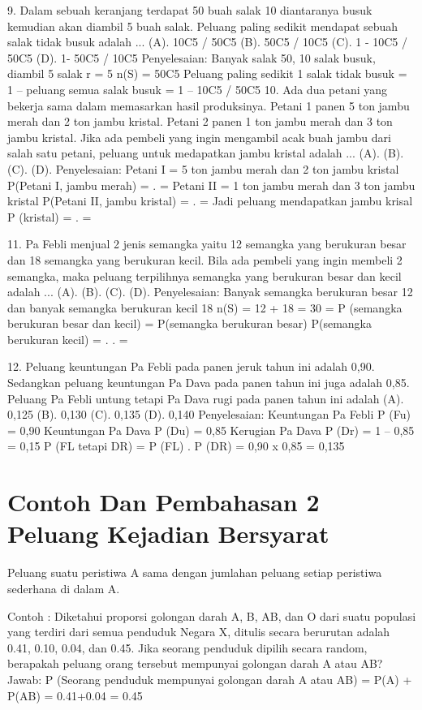 \documentclass[11pt,fleqn]{book} %
\begin{document}
{{9. Dalam sebuah keranjang terdapat 50 buah salak 10 diantaranya busuk kemudian akan diambil 5 buah salak. Peluang paling sedikit mendapat sebuah salak tidak busuk adalah ...
(A). 10C5 / 50C5 		
(B). 50C5 / 10C5		
(C). 1 - 10C5 / 50C5	
(D). 1- 50C5 / 10C5
Penyelesaian:
Banyak salak 50, 10 salak busuk, diambil 5 salak  r = 5
n(S) = 50C5
Peluang paling sedikit 1 salak tidak busuk
	= 1 – peluang semua salak busuk
	= 1 – 10C5 / 50C5
10. Ada dua petani yang bekerja sama dalam memasarkan hasil produksinya. Petani 1 panen 5 ton jambu merah dan 2 ton jambu kristal. Petani 2 panen 1 ton jambu merah dan 3 ton jambu kristal. Jika ada pembeli yang ingin mengambil acak buah jambu dari salah satu petani, peluang untuk medapatkan jambu kristal adalah ...
 (A).    			
 (B). 			
 (C). 			
 (D). 
Penyelesaian:
Petani I = 5 ton jambu merah dan 2 ton jambu kristal
 P(Petani I, jambu merah) =  .  = 
Petani II = 1 ton jambu merah dan 3 ton jambu kristal
 P(Petani II, jambu kristal) =  .  = 
Jadi peluang mendapatkan jambu krisal  P (kristal) =  .  = 

11. Pa Febli menjual 2 jenis semangka yaitu 12 semangka yang berukuran besar dan 18 semangka yang berukuran kecil. Bila ada pembeli yang ingin membeli 2 semangka, maka peluang terpilihnya semangka yang berukuran besar dan kecil adalah ...
(A). 			
(B). 			
(C). 			
(D). 
Penyelesaian:
Banyak semangka berukuran besar 12 dan banyak semangka berukuran kecil 18
 n(S) = 12 + 18 = 30
	= P (semangka berukuran besar dan kecil)
	= P(semangka berukuran besar)  P(semangka berukuran kecil)
	=  .    . 
	= 

12. Peluang keuntungan Pa Febli pada panen jeruk tahun ini adalah 0,90. Sedangkan peluang keuntungan Pa Dava pada panen tahun ini juga adalah 0,85. Peluang Pa Febli untung tetapi Pa Dava rugi pada panen tahun ini adalah 
(A). 0,125	
(B). 0,130		
(C). 0,135		
(D). 0,140
Penyelesaian:
Keuntungan Pa Febli  P (Fu) = 0,90
Keuntungan Pa Dava  P (Du) = 0,85
Kerugian Pa Dava  P (Dr) 	= 1 – 0,85
		 		= 0,15
P (FL tetapi DR) 	= P (FL) . P (DR)
			= 0,90 x 0,85
			= 0,135
			
			
\section{Contoh Dan Pembahasan 2 Peluang Kejadian Bersyarat}



Peluang suatu peristiwa A sama dengan jumlahan peluang setiap peristiwa sederhana di dalam A.

Contoh :
Diketahui proporsi golongan darah A, B, AB, dan O dari suatu populasi yang terdiri dari semua penduduk Negara X, ditulis secara berurutan adalah 0.41, 0.10, 0.04, dan 0.45. Jika seorang penduduk dipilih secara random, berapakah peluang orang tersebut
mempunyai golongan darah A atau AB?
Jawab:
P (Seorang penduduk mempunyai golongan darah A atau AB) = P(A) + P(AB) = 0.41+0.04 = 0.45

}}
\end{document}
